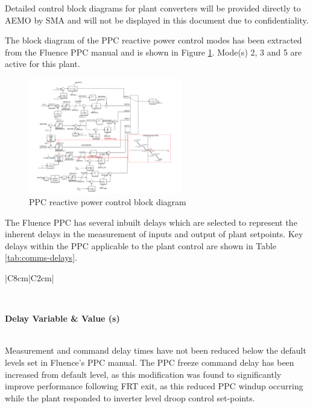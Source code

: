 \documentclass{../grid-link-report}
\newcommand{\projectassetsdir}{../project-assets}
\begin{document}
	Detailed control block diagrams for plant converters will be provided directly to AEMO by SMA and will not be displayed in this document due to confidentiality. 
	
	The block diagram of the PPC reactive power control modes has been extracted from the Fluence PPC manual and is shown in Figure \ref{fig:ppc-block-q-diagram}. Mode(s) 2, 3 and 5 are active for this plant.
	
	\begin{figure}[H]
		\centering
		\includegraphics[width=0.6\textwidth]{report-assets/images/ppc-qmode-diagram.png}
		\caption{PPC reactive power control block diagram}
		\label{fig:ppc-block-q-diagram}
	\end{figure}
	
	The Fluence PPC has several inbuilt delays which are selected to represent the inherent delays in the measurement of inputs and output of plant setpoints. Key delays within the PPC applicable to the plant control are shown in Table \ref{tab:comms-delays}.
	
	{
		\thicktablelines
		\begin{longtable}{|C{8cm}|C{2cm}|} 
			\caption{Measurement and command delay times}
			\label{tab:comms-delays}
			\\	
			\toprule
			
			\bfseries \color{white}Delay Variable & \bfseries \color{white}Value (s)\\
			\endhead
			\bottomrule \endfoot
			\\\hline
		\end{longtable}
	}
	
	Measurement and command delay times have not been reduced below the default levels set in Fluence's PPC manual. The PPC freeze command delay has been increased from default level, as this modification was found to significantly improve performance following FRT exit, as this reduced PPC windup occurring while the plant responded to inverter level droop control set-points.


	
	
	
	
	\makebackpage
	
	
	
	
	
\end{document}
